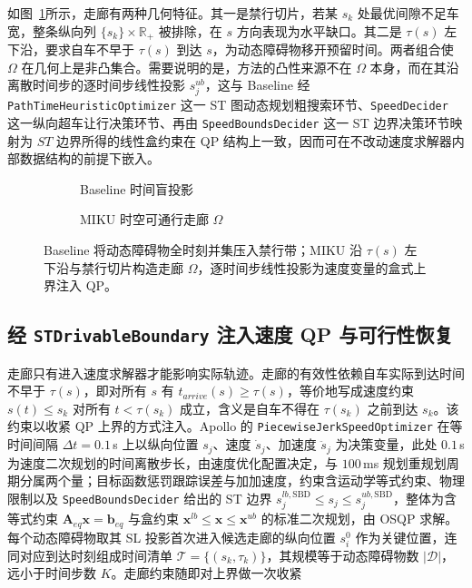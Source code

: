 \documentclass[a4paper,zihao=5]{ctexart}
\theoremstyle{definition}
\begin{document}
如图~\ref{fig:corridor}所示，走廊有两种几何特征。其一是禁行切片，若某 $s_k$ 处最优间隙不足车宽，整条纵向列 $\{s_k\}\times\mathbb{R}_{+}$ 被排除，在 $s$ 方向表现为水平缺口。其二是 $\tau(s)$ 左下沿，要求自车不早于 $\tau(s)$ 到达 $s$，为动态障碍物移开预留时间。两者组合使 $\Omega$ 在几何上是非凸集合。需要说明的是，方法的凸性来源不在 $\Omega$ 本身，而在其沿离散时间步的逐时间步线性投影 $s_j^{ub}$，这与 Baseline 经 \texttt{PathTimeHeuristicOptimizer} 这一 ST 图动态规划粗搜索环节、\texttt{SpeedDecider} 这一纵向超车让行决策环节、再由 \texttt{SpeedBoundsDecider} 这一 ST 边界决策环节映射为 $ST$ 边界所得的线性盒约束在 QP 结构上一致，因而可在不改动速度求解器内部数据结构的前提下嵌入。

\begin{figure}[htbp]
\centering
\begin{subfigure}[b]{0.43\textwidth}
  \centering
  \caption{Baseline 时间盲投影}
\end{subfigure}\hfill
\begin{subfigure}[b]{0.43\textwidth}
  \centering
  \caption{MIKU 时空可通行走廊 $\Omega$}
\end{subfigure}
\caption{ST 平面上的时空可通行走廊与上界收紧}
\caption*{Baseline 将动态障碍物全时刻并集压入禁行带；MIKU 沿 $\tau(s)$ 左下沿与禁行切片构造走廊 $\Omega$，逐时间步线性投影为速度变量的盒式上界注入 QP。}
\label{fig:corridor}
\end{figure}

\subsection{经 \texttt{STDrivableBoundary} 注入速度 QP 与可行性恢复}
\label{sec:method_inject}

走廊只有进入速度求解器才能影响实际轨迹。走廊的有效性依赖自车实际到达时间不早于 $\tau(s)$，即对所有 $s$ 有 $t_{arrive}(s)\geq\tau(s)$，等价地写成速度约束 $s(t)\leq s_k$ 对所有 $t<\tau(s_k)$ 成立，含义是自车不得在 $\tau(s_k)$ 之前到达 $s_k$。该约束以收紧 QP 上界的方式注入。Apollo 的 \texttt{PiecewiseJerkSpeedOptimizer} 在等时间间隔 $\Delta t = 0.1$\,s 上以纵向位置 $s_j$、速度 $\dot{s}_j$、加速度 $\ddot{s}_j$ 为决策变量，此处 $0.1$\,s 为速度二次规划的时间离散步长，由速度优化配置决定，与 $100$\,ms 规划重规划周期分属两个量；目标函数惩罚跟踪误差与加加速度，约束含运动学等式约束、物理限制以及 \texttt{SpeedBoundsDecider} 给出的 ST 边界 $s_j^{lb,\mathrm{SBD}} \leq s_j \leq s_j^{ub,\mathrm{SBD}}$，整体为含等式约束 $\mathbf{A}_{eq}\mathbf{x} = \mathbf{b}_{eq}$ 与盒约束 $\mathbf{x}^{lb} \leq \mathbf{x} \leq \mathbf{x}^{ub}$ 的标准二次规划，由 OSQP 求解。每个动态障碍物取其 SL 投影首次进入候选走廊的纵向位置 $s_i^{0}$ 作为关键位置，连同对应到达时刻组成时间清单 $\mathcal{T} = \{(s_k, \tau_k)\}$，其规模等于动态障碍物数 $|\mathcal{D}|$，远小于时间步数 $K$。走廊约束随即对上界做一次收紧
\end{document}
